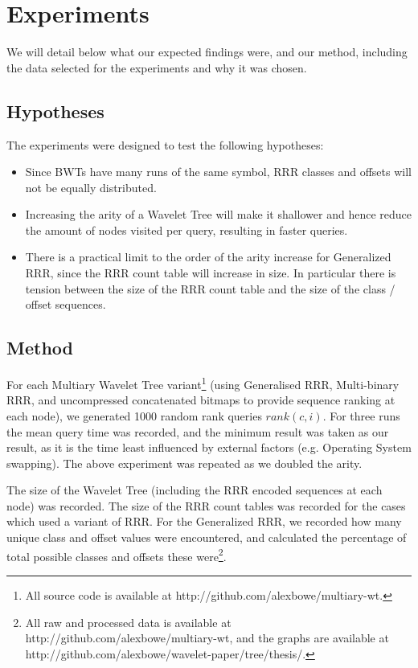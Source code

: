 \section{Experiments}
\label{sec:experiments}

We will detail below what our expected findings were, and our method, including 
the data selected for the experiments and why it was chosen.

\subsection{Hypotheses}
The experiments were designed to test the following hypotheses:

\begin{itemize}
    \item 	
			Since BWTs have many runs of the same symbol, RRR classes and 
			offsets will not be equally distributed.

    \item 	
			Increasing the arity of a Wavelet Tree will make it shallower and
		   	hence reduce the amount of nodes visited per query, resulting
		   	in faster queries.
			
    \item  
			There is a practical limit to the order of the arity increase for 
		   	Generalized RRR, since the RRR count table will increase in size. In
			particular there is tension between the size of the RRR 
			count table and the size of the class / offset sequences.
\end{itemize}

\subsection{Method}
For each Multiary Wavelet Tree variant\footnote{All source code is available at 
http://github.com/alexbowe/multiary-wt.} (using Generalised RRR, Multi-binary
RRR, and uncompressed concatenated bitmaps to provide
sequence ranking at each node), we generated 1000 
random rank queries $rank(c, i)$. For three runs the mean query time was 
recorded, and the minimum result was taken as our result, as it is the time 
least influenced by external factors (e.g. Operating System swapping). The above
experiment was repeated as we doubled the arity.

The size of  the Wavelet Tree (including the RRR encoded sequences at each node) 
was recorded. The size of the RRR count tables was recorded for the cases which 
used a variant of RRR. For the Generalized RRR, we recorded how many unique 
class and offset values were encountered, and calculated the percentage of total 
possible 
classes and offsets these were\footnote{All raw and processed data is 
available at http://github.com/alexbowe/multiary-wt, and the graphs are 
available at http://github.com/alexbowe/wavelet-paper/tree/thesis/.}.

